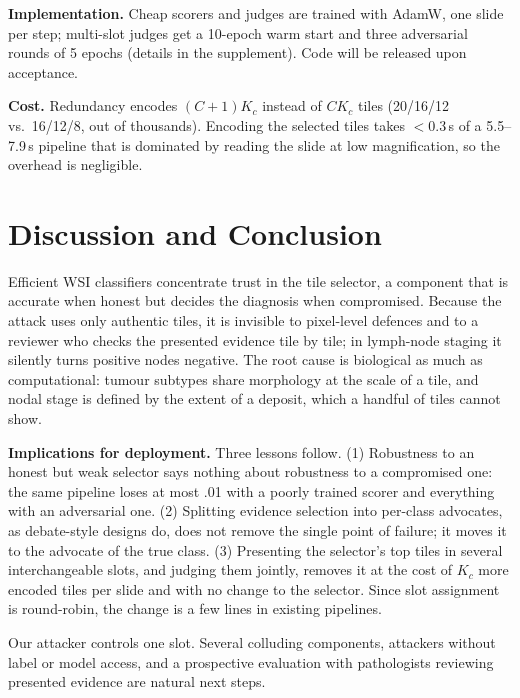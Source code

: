 \documentclass[runningheads]{llncs}
\begin{document}
\textbf{Implementation.} Cheap scorers and judges are trained with AdamW, one slide per step; multi-slot judges get a 10-epoch warm start and three adversarial rounds of 5 epochs (details in the supplement). Code will be released upon acceptance.

\textbf{Cost.} Redundancy encodes $(C{+}1)K_c$ instead of $CK_c$ tiles (20/16/12 vs.\ 16/12/8, out of thousands). Encoding the selected tiles takes $<$0.3\,s of a 5.5--7.9\,s pipeline that is dominated by reading the slide at low magnification, so the overhead is negligible.

\section{Discussion and Conclusion}
Efficient WSI classifiers concentrate trust in the tile selector, a component that is accurate when honest but decides the diagnosis when compromised. Because the attack uses only authentic tiles, it is invisible to pixel-level defences and to a reviewer who checks the presented evidence tile by tile; in lymph-node staging it silently turns positive nodes negative. The root cause is biological as much as computational: tumour subtypes share morphology at the scale of a tile, and nodal stage is defined by the extent of a deposit, which a handful of tiles cannot show.

\textbf{Implications for deployment.} Three lessons follow. (1) Robustness to an honest but weak selector says nothing about robustness to a compromised one: the same pipeline loses at most .01 with a poorly trained scorer and everything with an adversarial one. (2) Splitting evidence selection into per-class advocates, as debate-style designs do, does not remove the single point of failure; it moves it to the advocate of the true class. (3) Presenting the selector's top tiles in several interchangeable slots, and judging them jointly, removes it at the cost of $K_c$ more encoded tiles per slide and with no change to the selector. Since slot assignment is round-robin, the change is a few lines in existing pipelines.

Our attacker controls one slot. Several colluding components, attackers without label or model access, and a prospective evaluation with pathologists reviewing presented evidence are natural next steps.



\end{document}

